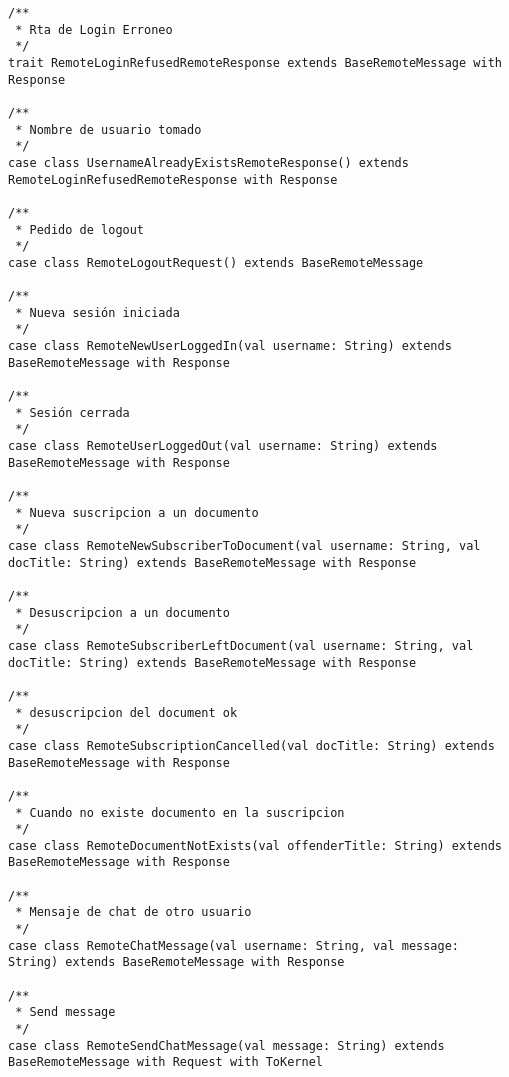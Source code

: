 {\begin{verbatim}
/**
 * Rta de Login Erroneo
 */
trait RemoteLoginRefusedRemoteResponse extends BaseRemoteMessage with Response

/**
 * Nombre de usuario tomado
 */
case class UsernameAlreadyExistsRemoteResponse() extends RemoteLoginRefusedRemoteResponse with Response

/**
 * Pedido de logout
 */
case class RemoteLogoutRequest() extends BaseRemoteMessage

/**
 * Nueva sesión iniciada
 */
case class RemoteNewUserLoggedIn(val username: String) extends BaseRemoteMessage with Response

/**
 * Sesión cerrada
 */
case class RemoteUserLoggedOut(val username: String) extends BaseRemoteMessage with Response

/**
 * Nueva suscripcion a un documento
 */
case class RemoteNewSubscriberToDocument(val username: String, val docTitle: String) extends BaseRemoteMessage with Response

/**
 * Desuscripcion a un documento
 */
case class RemoteSubscriberLeftDocument(val username: String, val docTitle: String) extends BaseRemoteMessage with Response

/**
 * desuscripcion del document ok
 */
case class RemoteSubscriptionCancelled(val docTitle: String) extends BaseRemoteMessage with Response

/**
 * Cuando no existe documento en la suscripcion
 */
case class RemoteDocumentNotExists(val offenderTitle: String) extends BaseRemoteMessage with Response

/**
 * Mensaje de chat de otro usuario
 */
case class RemoteChatMessage(val username: String, val message: String) extends BaseRemoteMessage with Response

/**
 * Send message
 */
case class RemoteSendChatMessage(val message: String) extends BaseRemoteMessage with Request with ToKernel
\end{verbatim}
}
